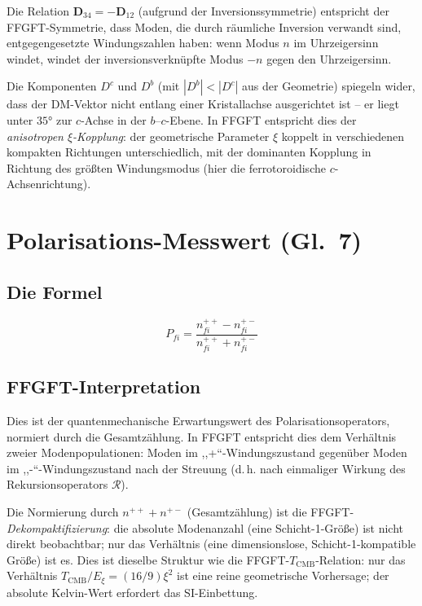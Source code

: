 Die Relation $\mathbf{D}_{34} = -\mathbf{D}_{12}$ (aufgrund der
Inversionssymmetrie) entspricht der FFGFT-Symmetrie, dass Moden, die durch
räumliche Inversion verwandt sind, entgegengesetzte Windungszahlen haben:
wenn Modus $n$ im Uhrzeigersinn windet, windet der inversionsverknüpfte
Modus $-n$ gegen den Uhrzeigersinn.

Die Komponenten $D^c$ und $D^b$ (mit $|D^b| < |D^c|$ aus der Geometrie)
spiegeln wider, dass der DM-Vektor nicht entlang einer Kristallachse
ausgerichtet ist -- er liegt unter $35°$ zur $c$-Achse in der $b$--$c$-Ebene.
In FFGFT entspricht dies der \emph{anisotropen $\xi$-Kopplung}: der
geometrische Parameter $\xi$ koppelt in verschiedenen kompakten Richtungen
unterschiedlich, mit der dominanten Kopplung in Richtung des größten
Windungsmodus (hier die ferrotoroidische $c$-Achsenrichtung).

\section{Polarisations-Messwert (Gl.~7)}

\subsection*{Die Formel}

\begin{equation}
  P_{fi} = \frac{n_{fi}^{++} - n_{fi}^{+-}}{n_{fi}^{++} + n_{fi}^{+-}}
  \tag{Ref.~Gl.~7}
\end{equation}

\subsection*{FFGFT-Interpretation}

Dies ist der quantenmechanische Erwartungswert des Polarisationsoperators,
normiert durch die Gesamtzählung. In FFGFT entspricht dies dem Verhältnis
zweier Modenpopulationen: Moden im ,,+``-Windungszustand gegenüber Moden im
,,-``-Windungszustand nach der Streuung (d.\,h. nach einmaliger Wirkung
des Rekursionsoperators $\mathcal{R}$).

Die Normierung durch $n^{++} + n^{+-}$ (Gesamtzählung) ist die FFGFT-
\emph{Dekompaktifizierung}: die absolute Modenanzahl (eine Schicht-1-Größe)
ist nicht direkt beobachtbar; nur das Verhältnis (eine dimensionslose,
Schicht-1-kompatible Größe) ist es. Dies ist dieselbe Struktur wie die
FFGFT-$T_{\mathrm{CMB}}$-Relation: nur das Verhältnis
$T_{\mathrm{CMB}}/E_\xi = (16/9)\xi^2$ ist eine reine geometrische Vorhersage;
der absolute Kelvin-Wert erfordert das SI-Einbettung.

